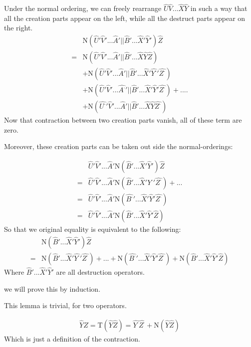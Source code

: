 ﻿\documentclass[twoside]{book}
\numberwithin{equation}{section}
\begin{document}
Under the normal ordering, we can freely rearrange $\hat{U}\hat{V}...\hat{X}\hat{Y}$ in such a way that all the creation parts appear on the left, while all the destruct parts appear on the right.
\begin{align}
&\mathrm{N}(\hat{U}'\hat{V}'...\hat{A}'||\hat{B}'...\hat{X}'\hat{Y}')\hat{Z} \nonumber \\
=&\mathrm{N}(\hat{U}'\hat{V}'...\hat{A}'||\hat{B}'...\hat{X}\hat{Y}\hat{Z})\nonumber \\
&+\mathrm{N}(\hat{U}'\hat{V}'...\hat{A}'||\hat{B}'...\hat{X}'\hat{Y^{\cdot}}'\hat{Z^{\cdot}})\nonumber \\
&+\mathrm{N}(\hat{U}'\hat{V}'...\hat{A^{\cdot}}'||\hat{B}'...\hat{X}'\hat{Y}'\hat{Z^{\cdot}})+....\nonumber \\
&+\mathrm{N}(\hat{U^{\cdot}}'\hat{V}'...\hat{A}'||\hat{B}'...\hat{X}\hat{Y}\hat{Z^{\cdot}})\nonumber
\end{align}
Now that contraction between two creation parts vanish, all of these term are zero.

Moreover, these creation parts can be taken out side the normal-orderings:

\begin{align}
&\hat{U}'\hat{V}'...\hat{A}'\mathrm{N}(\hat{B}'...\hat{X}'\hat{Y}') \hat{Z} \nonumber \\
=&\hat{U}'\hat{V}'...\hat{A}'\mathrm{N}(\hat{B}'...\hat{X}'\hat{Y^{\cdot}}'\hat{Z^{\cdot}}) + ... \nonumber \\
=&\hat{U}'\hat{V}'...\hat{A}'\mathrm{N}(\hat{B^{\cdot}}'...\hat{X}'\hat{Y}'\hat{Z^{\cdot}})  \nonumber \\
=&\hat{U}'\hat{V}'...\hat{A}'\mathrm{N}(\hat{B}'...\hat{X}'\hat{Y}'\hat{Z}) \nonumber
\end{align}
So that we original equality is equivalent to the following:
\begin{align}
&\mathrm{N}(\hat{B}'...\hat{X}'\hat{Y}') \hat{Z}  \nonumber \\
=&\mathrm{N}(\hat{B}'...\hat{X}'\hat{Y^{\cdot}}'\hat{Z^{\cdot}}) + ...+\mathrm{N}(\hat{B^{\cdot}}'...\hat{X}'\hat{Y}'\hat{Z^{\cdot}})+ \mathrm{N}(\hat{B}'...\hat{X}'\hat{Y}'\hat{Z}) \nonumber
\end{align}
Where $\hat{B}'...\hat{X}'\hat{Y}'$ are all destruction operators.

we will prove this by induction.

This lemma is trivial, for two operators.

\begin{align}
\hat{Y}\hat{Z}=\mathrm{T}(\hat{Y}\hat{Z})=\hat{Y^{\cdot}}\hat{Z^{\cdot}} +\mathrm{N}(\hat{Y}\hat{Z})
\nonumber
\end{align}
Which is just a definition of the contraction.
\end{document}
